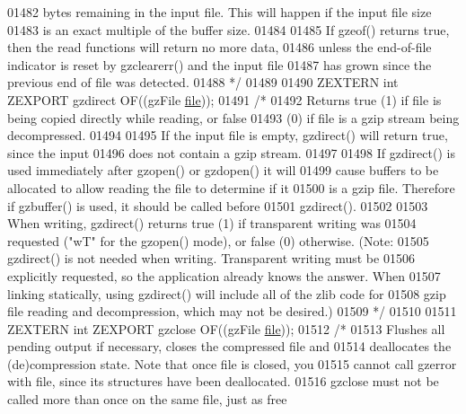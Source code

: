\begin{DoxyCode}
01482 \textcolor{comment}{   bytes remaining in the input file.  This will happen if the input file size}
01483 \textcolor{comment}{   is an exact multiple of the buffer size.}
01484 \textcolor{comment}{}
01485 \textcolor{comment}{     If gzeof() returns true, then the read functions will return no more data,}
01486 \textcolor{comment}{   unless the end-of-file indicator is reset by gzclearerr() and the input file}
01487 \textcolor{comment}{   has grown since the previous end of file was detected.}
01488 \textcolor{comment}{*/}
01489 
01490 ZEXTERN \textcolor{keywordtype}{int} ZEXPORT gzdirect OF((gzFile \hyperlink{structfile}{file}));
01491 \textcolor{comment}{/*}
01492 \textcolor{comment}{     Returns true (1) if file is being copied directly while reading, or false}
01493 \textcolor{comment}{   (0) if file is a gzip stream being decompressed.}
01494 \textcolor{comment}{}
01495 \textcolor{comment}{     If the input file is empty, gzdirect() will return true, since the input}
01496 \textcolor{comment}{   does not contain a gzip stream.}
01497 \textcolor{comment}{}
01498 \textcolor{comment}{     If gzdirect() is used immediately after gzopen() or gzdopen() it will}
01499 \textcolor{comment}{   cause buffers to be allocated to allow reading the file to determine if it}
01500 \textcolor{comment}{   is a gzip file.  Therefore if gzbuffer() is used, it should be called before}
01501 \textcolor{comment}{   gzdirect().}
01502 \textcolor{comment}{}
01503 \textcolor{comment}{     When writing, gzdirect() returns true (1) if transparent writing was}
01504 \textcolor{comment}{   requested ("wT" for the gzopen() mode), or false (0) otherwise.  (Note:}
01505 \textcolor{comment}{   gzdirect() is not needed when writing.  Transparent writing must be}
01506 \textcolor{comment}{   explicitly requested, so the application already knows the answer.  When}
01507 \textcolor{comment}{   linking statically, using gzdirect() will include all of the zlib code for}
01508 \textcolor{comment}{   gzip file reading and decompression, which may not be desired.)}
01509 \textcolor{comment}{*/}
01510 
01511 ZEXTERN \textcolor{keywordtype}{int} ZEXPORT    gzclose OF((gzFile \hyperlink{structfile}{file}));
01512 \textcolor{comment}{/*}
01513 \textcolor{comment}{     Flushes all pending output if necessary, closes the compressed file and}
01514 \textcolor{comment}{   deallocates the (de)compression state.  Note that once file is closed, you}
01515 \textcolor{comment}{   cannot call gzerror with file, since its structures have been deallocated.}
01516 \textcolor{comment}{   gzclose must not be called more than once on the same file, just as free}

\end{DoxyCode}
